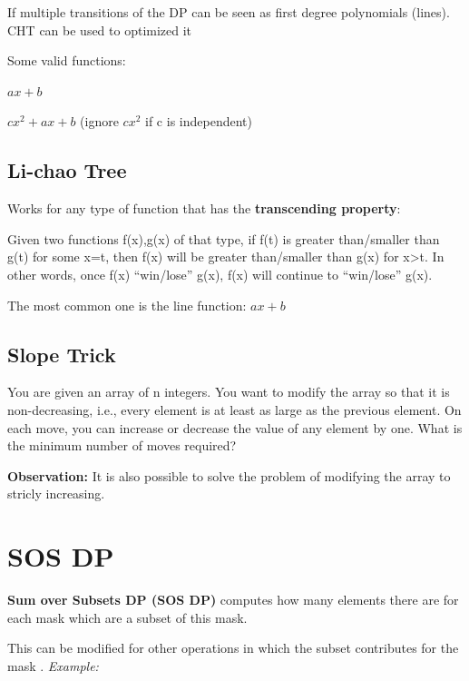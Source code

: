         If multiple transitions of the DP can be seen as 
        first degree polynomials (lines). CHT can be used to optimized it

        Some valid functions:

        $ax + b$
        
        $cx^2 + ax + b$ 
        (ignore $cx^2$ if c is independent)


    \subsection{Li-chao Tree}

        Works for any type of function that has the \textbf{transcending property}:

        Given two functions f(x),g(x) of that type, 
        if f(t) is greater than/smaller than g(t) for some x=t,
        then f(x) will be greater than/smaller than g(x) for x>t.
        In other words, once f(x) “win/lose” g(x), f(x) will continue to “win/lose” g(x).

        The most common one is the line function: $ ax + b $

    \subsection{Slope Trick}
    
    You are given an array of n integers. You want to modify the array so that it is non-decreasing, i.e., every element is at least as large as the previous element.
    On each move, you can increase or decrease the value of any element by one. What is the minimum number of moves required?
    
    \textbf{Observation: } It is also possible to solve the problem of modifying the array to stricly increasing.


\section{SOS DP}

    \textbf{Sum over Subsets DP (SOS DP)} computes how many elements there are for each mask
    which are a subset of this mask.

    This can be modified for other operations in which the subset contributes for the mask
    .
    \textit{Example:}

